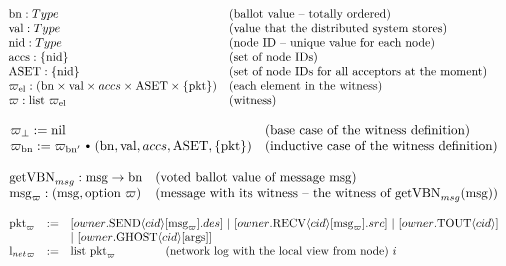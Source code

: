 \begin{figure}
\raggedright
{}

$
\begin{array}{llll}
\mathrm{bn}: Type & \mbox{(ballot value -- totally ordered)} \\
\mathrm{val}: Type & \mbox{(value that the distributed system stores)} \\
\mathrm{nid} : Type & \mbox{(node ID --  unique value for each node)} & \\
\mathrm{accs} : \{\mathrm{nid}\} & \mbox{(set of node IDs)}\\
\mathrm{ASET} : \{\mathrm{nid}\} & \mbox{(set of node IDs for all acceptors at the moment)}\\
\varpi_{\mathrm{el}} : (\mathrm{bn} \times \mathrm{val} \times accs  \times \mathrm{ASET}  \times \{\mathrm{pkt}\}) & \mbox{(each  element in the witness)}\\
\varpi  : \mbox{list}\ \varpi_{\mathrm{el}}  & \mbox{(witness)}\\
\end{array}$
\vspace{0.7em}

\vspace{0.2em}

$
\begin{array}{ll}
\witness_{\bot} := \mbox{nil} & \mbox{(base case of the witness definition)}\\
\witness_{\ballotnum} := \witness_{\ballotnum'}\ \cons\ (\ballotnum, \dsvalue, accs, \accsset, \set{\packet}) &  \mbox{(inductive case of the witness definition)}\\
\end{array}
$
\vspace{0.7em}


\raggedright
{}
\vspace{0.2em}

$
\begin{array}{llll}
\mathrm{getVBN}_{msg} : \mathrm{msg} \rightarrow \mathrm{bn}  & \mbox{(voted ballot value of message}\ \mathrm{msg}\mbox{)} \\
\mathrm{msg}_\varpi : (\mathrm{msg}, \mbox{option}\ \varpi) & \mbox{(message with its witness -- the witness of}\ \mathrm{getVBN}_{msg}(\mathrm{msg})\mbox{)}\\
\end{array}
$
\vspace{0.7em}

$
\begin{array}{lll}
\packet_\witness & :=& \fsendpkt{owner}{cid}{\msg_{\witness}}{des}~\vert~\frecvpkt{owner}{cid}{\msg_\witness}{src}~\vert~\ftimeoutpkt{owner}{cid}\\
&&\vert~\fghostpkt{owner}{cid}{\argus}\\
{\networklog}_{\witness} & := & \mbox{list}\ \packet_{\witness}  \ \ \ \ \ \ \ \ \ \ \ \ \ \mbox{(network log with the local view from node)} \  i \\
\end{array}
$
\vspace{0.7em}


\end{figure}
